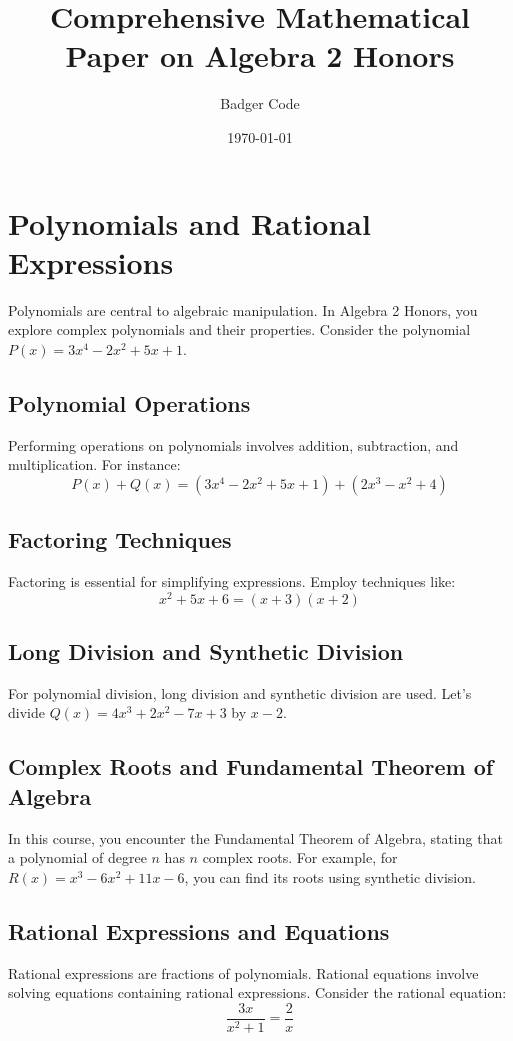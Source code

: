 \documentclass{article}
\title{Comprehensive Mathematical Paper on Algebra 2 Honors}
\author{Badger Code}
\date{\today}
\begin{document}
\maketitle

\section{Polynomials and Rational Expressions}
Polynomials are central to algebraic manipulation. In Algebra 2 Honors, you explore complex polynomials and their properties. Consider the polynomial \(P(x) = 3x^4 - 2x^2 + 5x + 1\).

\subsection{Polynomial Operations}
Performing operations on polynomials involves addition, subtraction, and multiplication. For instance:
\[ P(x) + Q(x) = (3x^4 - 2x^2 + 5x + 1) + (2x^3 - x^2 + 4) \]

\subsection{Factoring Techniques}
Factoring is essential for simplifying expressions. Employ techniques like:
\[ x^2 + 5x + 6 = (x + 3)(x + 2) \]

\subsection{Long Division and Synthetic Division}
For polynomial division, long division and synthetic division are used. Let's divide \(Q(x) = 4x^3 + 2x^2 - 7x + 3\) by \(x - 2\).

\subsection{Complex Roots and Fundamental Theorem of Algebra}
In this course, you encounter the Fundamental Theorem of Algebra, stating that a polynomial of degree \(n\) has \(n\) complex roots. For example, for \(R(x) = x^3 - 6x^2 + 11x - 6\), you can find its roots using synthetic division.

\subsection{Rational Expressions and Equations}
Rational expressions are fractions of polynomials. Rational equations involve solving equations containing rational expressions. Consider the rational equation:
\[ \frac{3x}{x^2 + 1} = \frac{2}{x} \]
\end{document}
